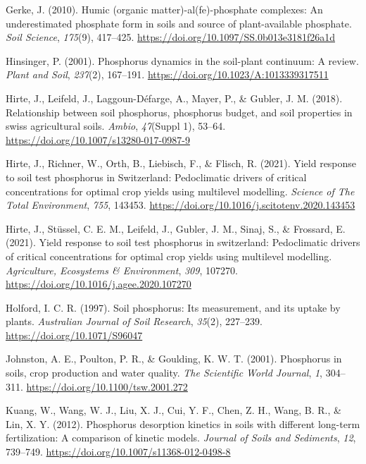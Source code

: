 \documentclass[
  a4paper,
]{article}
\newlength{\cslhangindent}
\newenvironment{CSLReferences}[2] %
 {\begin{list}{}{%
  \setlength{\itemindent}{0pt}
  \setlength{\leftmargin}{0pt}
  \setlength{\parsep}{0pt}
  \ifodd #1
   \setlength{\leftmargin}{\cslhangindent}
   \setlength{\itemindent}{-1\cslhangindent}
  \fi
  \setlength{\itemsep}{#2\baselineskip}}}
 {\end{list}}
\begin{document}
\begin{CSLReferences}{1}{0}
Gerke, J. (2010). Humic (organic matter)-al(fe)-phosphate complexes: An
underestimated phosphate form in soils and source of plant-available
phosphate. \emph{Soil Science}, \emph{175}(9), 417--425.
\url{https://doi.org/10.1097/SS.0b013e3181f26a1d}

Hinsinger, P. (2001). Phosphorus dynamics in the soil-plant continuum: A
review. \emph{Plant and Soil}, \emph{237}(2), 167--191.
\url{https://doi.org/10.1023/A:1013339317511}

Hirte, J., Leifeld, J., Laggoun-Défarge, A., Mayer, P., \& Gubler, J. M.
(2018). Relationship between soil phosphorus, phosphorus budget, and
soil properties in swiss agricultural soils. \emph{Ambio},
\emph{47}(Suppl 1), 53--64.
\url{https://doi.org/10.1007/s13280-017-0987-9}

Hirte, J., Richner, W., Orth, B., Liebisch, F., \& Flisch, R. (2021).
Yield response to soil test phosphorus in {Switzerland}: {Pedoclimatic}
drivers of critical concentrations for optimal crop yields using
multilevel modelling. \emph{Science of The Total Environment},
\emph{755}, 143453.
\url{https://doi.org/10.1016/j.scitotenv.2020.143453}

Hirte, J., Stüssel, C. E. M., Leifeld, J., Gubler, J. M., Sinaj, S., \&
Frossard, E. (2021). Yield response to soil test phosphorus in
switzerland: Pedoclimatic drivers of critical concentrations for optimal
crop yields using multilevel modelling. \emph{Agriculture, Ecosystems \&
Environment}, \emph{309}, 107270.
\url{https://doi.org/10.1016/j.agee.2020.107270}

Holford, I. C. R. (1997). Soil phosphorus: Its measurement, and its
uptake by plants. \emph{Australian Journal of Soil Research},
\emph{35}(2), 227--239. \url{https://doi.org/10.1071/S96047}

Johnston, A. E., Poulton, P. R., \& Goulding, K. W. T. (2001).
Phosphorus in soils, crop production and water quality. \emph{The
Scientific World Journal}, \emph{1}, 304--311.
\url{https://doi.org/10.1100/tsw.2001.272}

Kuang, W., Wang, W. J., Liu, X. J., Cui, Y. F., Chen, Z. H., Wang, B.
R., \& Lin, X. Y. (2012). Phosphorus desorption kinetics in soils with
different long-term fertilization: A comparison of kinetic models.
\emph{Journal of Soils and Sediments}, \emph{12}, 739--749.
\url{https://doi.org/10.1007/s11368-012-0498-8}


\end{CSLReferences}
\end{document}
